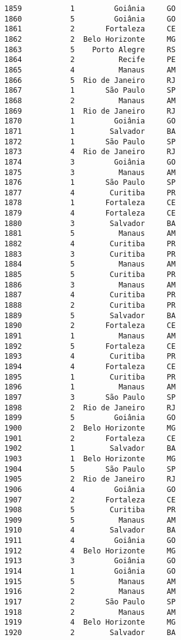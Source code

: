 \documentclass[11pt]{article}
\begin{document}
\begin{Verbatim}[commandchars=\\\{\}]
1859           1         Goiânia     GO  
1860           5         Goiânia     GO  
1861           2       Fortaleza     CE  
1862           2  Belo Horizonte     MG  
1863           5    Porto Alegre     RS  
1864           2          Recife     PE  
1865           4          Manaus     AM  
1866           5  Rio de Janeiro     RJ  
1867           1       São Paulo     SP  
1868           2          Manaus     AM  
1869           1  Rio de Janeiro     RJ  
1870           1         Goiânia     GO  
1871           1        Salvador     BA  
1872           1       São Paulo     SP  
1873           4  Rio de Janeiro     RJ  
1874           3         Goiânia     GO  
1875           3          Manaus     AM  
1876           1       São Paulo     SP  
1877           4        Curitiba     PR  
1878           1       Fortaleza     CE  
1879           4       Fortaleza     CE  
1880           3        Salvador     BA  
1881           5          Manaus     AM  
1882           4        Curitiba     PR  
1883           3        Curitiba     PR  
1884           5          Manaus     AM  
1885           5        Curitiba     PR  
1886           3          Manaus     AM  
1887           4        Curitiba     PR  
1888           2        Curitiba     PR  
1889           5        Salvador     BA  
1890           2       Fortaleza     CE  
1891           1          Manaus     AM  
1892           5       Fortaleza     CE  
1893           4        Curitiba     PR  
1894           4       Fortaleza     CE  
1895           1        Curitiba     PR  
1896           1          Manaus     AM  
1897           3       São Paulo     SP  
1898           2  Rio de Janeiro     RJ  
1899           5         Goiânia     GO  
1900           2  Belo Horizonte     MG  
1901           2       Fortaleza     CE  
1902           1        Salvador     BA  
1903           1  Belo Horizonte     MG  
1904           5       São Paulo     SP  
1905           2  Rio de Janeiro     RJ  
1906           4         Goiânia     GO  
1907           2       Fortaleza     CE  
1908           5        Curitiba     PR  
1909           5          Manaus     AM  
1910           4        Salvador     BA  
1911           4         Goiânia     GO  
1912           4  Belo Horizonte     MG  
1913           3         Goiânia     GO  
1914           1         Goiânia     GO  
1915           5          Manaus     AM  
1916           2          Manaus     AM  
1917           2       São Paulo     SP  
1918           2          Manaus     AM  
1919           4  Belo Horizonte     MG  
1920           2        Salvador     BA  

\end{Verbatim}
\end{document}
